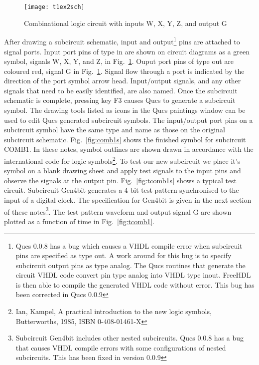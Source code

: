 \begin{figure}
  \centering
  \texttt{[image: t1ex2sch]}
  \caption{Combinational logic circuit with inputs W, X, Y, Z, and output G}
  \label{fig:t1ex2sch}
\end{figure}

\addvspace{12pt}

After drawing a subcircuit schematic, input and output\footnote{Qucs
  0.0.8 has a bug which causes a VHDL compile error when subcircuit
  pins are specified as type out. A work around for this bug is to
  specify subcircuit output pins as type analog.  The Qucs routines
  that generate the circuit VHDL code convert pin type analog into
  VHDL type inout. FreeHDL is then able to compile the generated VHDL
  code without error. This bug has been corrected in Qucs 0.0.9} pins
are attached to signal ports.  Input port pins of type in are shown on
circuit diagrams as a green symbol, signals W, X, Y, and Z, in
Fig.~\ref{fig:t1ex2sch}.  Ouput port pins of type out are coloured
red, signal G in Fig.~\ref{fig:t1ex2sch}. Signal flow through a port
is indicated by the direction of the port symbol arrow
head. Input/output signals, and any other signals that need to be
easily identified, are also named.  Once the subcircuit schematic is
complete, pressing key F3 causes Qucs to generate a subcircuit symbol.
The drawing tools listed as icons in the Qucs paintings window can be
used to edit Qucs generated subcircuit symbols.  The input/output port
pins on a subcircuit symbol have the same type and name as those on
the original subcircuit schematic.  Fig.~\ref{fig:comb1s} shows the
finished symbol for subcircuit COMB1. In these notes, symbol outlines
are shown drawn in accordance with the international code for logic
symbols\footnote{Ian, Kampel, A practical introduction to the new
  logic symbols, Butterworths, 1985, ISBN 0-408-01461-X}. To test our
new subcircuit we place it's symbol on a blank drawing sheet and apply
test signals to the input pins and observe the signals at the output
pin.  Fig.~\ref{fig:tcomb1s} shows a typical test circuit.  Subcircuit
Gen4bit generates a 4 bit test pattern synchronised to the input of a
digital clock. The specification for Gen4bit is given in the next
section of these notes\footnote{Subcircuit Gen4bit includes other
  nested subcircuits.  Qucs 0.0.8 has a bug that causes VHDL compile
  errors with some configurations of nested subcircuits. This has been
  fixed in version 0.0.9 }.  The test pattern waveform and output
signal G are shown plotted as a function of time in
Fig.~\ref{fig:tcomb1}.

